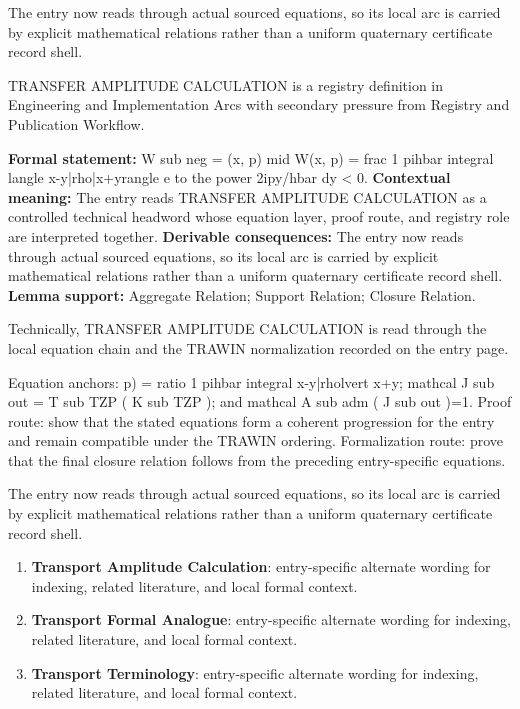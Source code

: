 The entry now reads through actual sourced equations, so its local arc is carried by explicit mathematical relations rather than a uniform quaternary certificate record shell.
\clearpage


\begingroup\small
{}
TRANSFER AMPLITUDE CALCULATION is a registry definition in Engineering and Implementation Arcs with secondary pressure from Registry and Publication Workflow.

\begingroup\footnotesize\setlength{\emergencystretch}{3em}\sloppy
\textbf{Formal statement:} W sub neg = (x, p) mid W(x, p) = frac 1 pihbar integral langle x-y|rho|x+yrangle e to the power 2ipy/hbar dy < 0. \textbf{Contextual meaning:} The entry reads TRANSFER AMPLITUDE CALCULATION as a controlled technical headword whose equation layer, proof route, and registry role are interpreted together. \textbf{Derivable consequences:} The entry now reads through actual sourced equations, so its local arc is carried by explicit mathematical relations rather than a uniform quaternary certificate record shell. \textbf{Lemma support:} Aggregate Relation; Support Relation; Closure Relation.\par
\endgroup

Technically, TRANSFER AMPLITUDE CALCULATION is read through the local equation chain and the TRAWIN normalization recorded on the entry page.

Equation anchors: p) = ratio 1 pihbar integral x-y|rholvert x+y; mathcal J sub out = T sub TZP ( K sub TZP ); and mathcal A sub adm ( J sub out )=1. Proof route: show that the stated equations form a coherent progression for the entry and remain compatible under the TRAWIN ordering. Formalization route: prove that the final closure relation follows from the preceding entry-specific equations.

The entry now reads through actual sourced equations, so its local arc is carried by explicit mathematical relations rather than a uniform quaternary certificate record shell.
\endgroup

\begin{enumerate}[leftmargin=1.6em,itemsep=6pt,topsep=4pt]
\item \textbf{Transport Amplitude Calculation}: entry-specific alternate wording for indexing, related literature, and local formal context.
\item \textbf{Transport Formal Analogue}: entry-specific alternate wording for indexing, related literature, and local formal context.
\item \textbf{Transport Terminology}: entry-specific alternate wording for indexing, related literature, and local formal context.
\end{enumerate}

